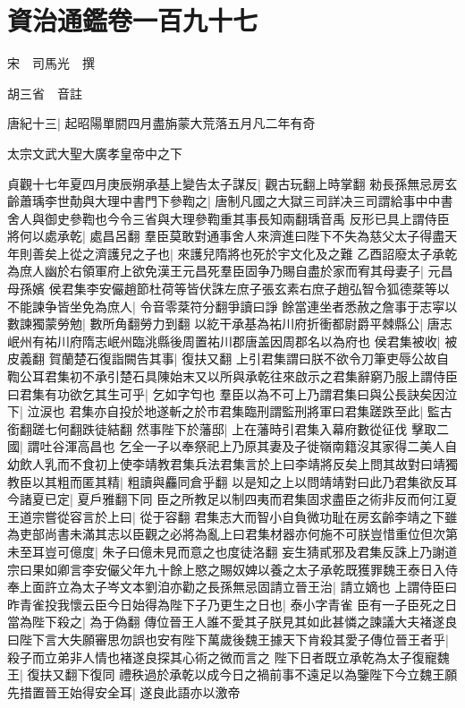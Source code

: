 \section{資治通鑑卷一百九十七}
宋　司馬光　撰

胡三省　音註

唐紀十三|{
	起昭陽單閼四月盡旃蒙大荒落五月凡二年有奇}


太宗文武大聖大廣孝皇帝中之下

貞觀十七年夏四月庚辰朔承基上變告太子謀反|{
	觀古玩翻上時掌翻}
勑長孫無忌房玄齡蕭瑀李世勣與大理中書門下參鞫之|{
	唐制凡國之大獄三司詳决三司謂給事中中書舍人與御史參鞫也今令三省與大理參鞫重其事長知兩翻瑀音禹}
反形已具上謂侍臣將何以處承乾|{
	處昌呂翻}
羣臣莫敢對通事舍人來濟進曰陛下不失為慈父太子得盡天年則善矣上從之濟護兒之子也|{
	來護兒隋將也死於宇文化及之難}
乙酉詔廢太子承乾為庶人幽於右領軍府上欲免漢王元昌死羣臣固争乃賜自盡於家而宥其母妻子|{
	元昌母孫嬪}
侯君集李安儼趙節杜荷等皆伏誅左庶子張玄素右庶子趙弘智令狐德棻等以不能諫争皆坐免為庶人|{
	令音零棻符分翻爭讀曰諍}
餘當連坐者悉赦之詹事于志寜以數諫獨蒙勞勉|{
	數所角翻勞力到翻}
以紇干承基為祐川府折衝都尉爵平棘縣公|{
	唐志岷州有祐川府隋志岷州臨洮縣後周置祐川郡唐盖因周郡名以為府也}
侯君集被收|{
	被皮義翻}
賀蘭楚石復詣闕告其事|{
	復扶又翻}
上引君集謂曰朕不欲令刀筆吏辱公故自鞫公耳君集初不承引楚石具陳始末又以所與承乾往來啟示之君集辭窮乃服上謂侍臣曰君集有功欲乞其生可乎|{
	乞如字匄也}
羣臣以為不可上乃謂君集曰與公長訣矣因泣下|{
	泣涙也}
君集亦自投於地遂斬之於市君集臨刑謂監刑將軍曰君集蹉跌至此|{
	監古銜翻蹉七何翻跌徒結翻}
然事陛下於藩邸|{
	上在藩時引君集入幕府數從征伐}
擊取二國|{
	謂吐谷渾高昌也}
乞全一子以奉祭祀上乃原其妻及子徙嶺南籍沒其家得二美人自幼飲人乳而不食初上使李靖教君集兵法君集言於上曰李靖將反矣上問其故對曰靖獨教臣以其粗而匿其精|{
	粗讀與麤同倉乎翻}
以是知之上以問靖靖對曰此乃君集欲反耳今諸夏已定|{
	夏戶雅翻下同}
臣之所教足以制四夷而君集固求盡臣之術非反而何江夏王道宗嘗從容言於上曰|{
	從于容翻}
君集志大而智小自負微功耻在房玄齡李靖之下雖為吏部尚書未滿其志以臣觀之必將為亂上曰君集材器亦何施不可朕豈惜重位但次第未至耳豈可億度|{
	朱子曰億未見而意之也度徒洛翻}
妄生猜貳邪及君集反誅上乃謝道宗曰果如卿言李安儼父年九十餘上愍之賜奴婢以養之太子承乾既獲罪魏王泰日入侍奉上面許立為太子岑文本劉洎亦勸之長孫無忌固請立晉王治|{
	請立嫡也}
上謂侍臣曰昨青雀投我懷云臣今日始得為陛下子乃更生之日也|{
	泰小字青雀}
臣有一子臣死之日當為陛下殺之|{
	為于偽翻}
傳位晉王人誰不愛其子朕見其如此甚憐之諫議大夫褚遂良曰陛下言大失願審思勿誤也安有陛下萬歲後魏王據天下肯殺其愛子傳位晉王者乎|{
	殺子而立弟非人情也褚遂良探其心術之微而言之}
陛下日者既立承乾為太子復寵魏王|{
	復扶又翻下復同}
禮秩過於承乾以成今日之禍前事不遠足以為鑒陛下今立魏王願先措置晉王始得安全耳|{
	遂良此語亦以激帝}
